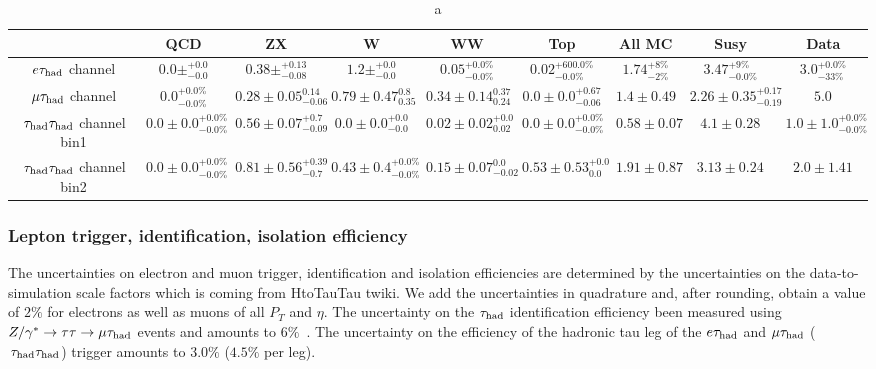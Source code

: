 \begin{table}[!h]
\tiny{
\begin{center}
\begin{tabular}{|c|c|c|c|c|c|c|c|c|}
\hline
                             & QCD & ZX    & W  & WW   & Top    & All MC & Susy & Data \\\hline 
$e\tau_{\rm had}$ channel           & $0.0 \pm ^{+0.0} _{-0.0} $ & $0.38 \pm  ^{+0.13} _{-0.08}  $    &  $1.2 \pm  ^{+0.0} _{-0.0} $      &  $0.05 ^{+0.0 \%} _{-0.0 \%} $   &$0.02 ^{+600.0 \%} _{-0.0 \%} $           & $1.74 ^{+8 \%} _{-2 \%} $       & $3.47 ^{+9 \%} _{-0.0 \%} $ & $3.0 ^{+0.0 \%} _{-33 \%}$    \\\hline   

$\mu\tau_{\rm had}$ channel &  $0.0 ^{+0.0 \%} _{-0.0 \%} $     &  $0.28 \pm 0.05 ^{0.14} _{-0.06} $      &  $0.79 \pm 0.47^{0.8} _{0.35} $  & $0.34 \pm 0.14 ^{0.37} _{0.24} $        &  $0.0\pm0.0 ^{+0.67} _{-0.06} $   &    $1.4 \pm 0.49 ^{} _{} $      &  $2.26 \pm 0.35^{+0.17} _{-0.19} $      & $5.0 ^{} _{} $     \\\hline  

$\,\tau_{\rm had}\tau_{\rm had}$ channel bin1 &  $0.0\pm 0.0 ^{+0.0 \%} _{-0.0 \%}$   &    $0.56 \pm 0.07 ^{+0.7} _{-0.09}$    &  $0.0 \pm 0.0 ^{+0.0} _{-0.0}$      &  $0.02 \pm 0.02 ^{+0.0} _{0.02}$        &   $0.0 \pm 0.0 ^{+0.0 \%} _{-0.0 \%}$        &    $0.58 \pm 0.07 ^{} _{}$     & $4.1 \pm 0.28^{} _{} $    & $1.0 \pm1.0 ^{+0.0 \%} _{-0.0 \%}$\\\hline

$\,\tau_{\rm had}\tau_{\rm had}$ channel bin2 &  $0.0 \pm 0.0 ^{+0.0 \%} _{-0.0 \%}$   &     $0.81 \pm 0.56 ^{+0.39} _{-0.7}$     &    $0.43 \pm 0.4 ^{+0.0 \%} _{-0.0 \%}$     &     $0.15 \pm 0.07 ^{0.0} _{-0.02}$     &   $0.53 \pm 0.53 ^{+0.0} _{0.0}$   &      $1.91 \pm 0.87 ^ {} _{}$     &     $3.13 \pm 0.24 ^{} _{}$   &  $2.0 \pm 1.41 ^{} _{}$    \\\hline
\end{tabular} 
\end{center}
\caption{a}
\label{Tab.susyHiggs}
}
\end{table}     


\subsubsection{Lepton trigger, identification, isolation efficiency}

  The uncertainties on electron and muon trigger, identification and isolation efficiencies
  are determined by the uncertainties on the data-to-simulation scale factors 
  which is coming from HtoTauTau twiki.
  We add the uncertainties in quadrature and, after rounding, obtain a value of $2\%$ for electrons as well as muons of all $P_{T}$ and $\eta$.
  The uncertainty on the $\tau_{\rm had}$ identification efficiency 
  been measured using $Z/\gamma^{*} \to \tau\tau \to \mu\tau_{\rm had}$ events
  and amounts to $6\%$~\cite{TauPOG}.
  The uncertainty on the efficiency of the hadronic tau leg of the $e\tau_{\rm had}$ and $\mu\tau_{\rm had}$ ($\,\tau_{\rm had}\tau_{\rm had}$) trigger
  amounts to $3.0\%$ ($4.5\%$ per leg).

